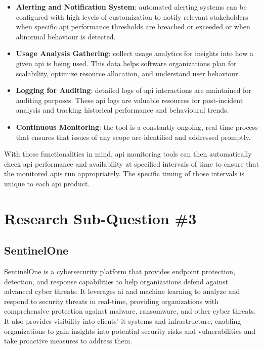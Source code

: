 \begin{multicols}{2}
\begin{itemize}
            \item \textbf{Alerting and Notification System}: automated alerting systems can be configured with high levels of
                  customization to notify relevant stakeholders when specific \acrshort{api} performance thresholds are breached
                  or exceeded or when abnormal behaviour is detected.
            \item \textbf{Usage Analysis Gathering}: collect usage analytics for insights into how a given \acrshort{api} is
                  being used. This data helps software organizations plan for scalability, optimize resource allocation, and
                  understand user behaviour.
            \item \textbf{Logging for Auditing}: detailed logs of \acrshort{api} interactions are maintained for auditing
                  purposes. These \acrshort{api} logs are valuable resources for post-incident analysis and tracking historical
                  performance and behavioural trends.
            \item \textbf{Continuous Monitoring}: the tool is a constantly ongoing, real-time process that ensures that
                  issues of any scope are identified and addressed promptly.
      \end{itemize}
      With those functionalities in mind, \acrshort{api} monitoring tools can then automatically check \acrshort{api}
      performance and availability at specified intervals of time to ensure that the monitored \acrshort{api}s run
      appropriately. The specific timing of those intervals is unique to each \acrshort{api} product.
      \section{Research Sub-Question \#3}
      \subsection{SentinelOne} %
      SentinelOne is a cybersecurity platform that provides endpoint protection, detection, and response capabilities to
      help organizations defend against advanced cyber threats. It leverages \acrlong{ai} and machine learning to analyze
      and respond to security threats in real-time, providing organizations with comprehensive protection against malware,
      ransomware, and other cyber threats. It also provides visibility into clients' \acrshort{it} systems and infrastructure,
      enabling organizations to gain insights into potential security risks and vulnerabilities and take proactive measures
      to address them.

\end{multicols}
